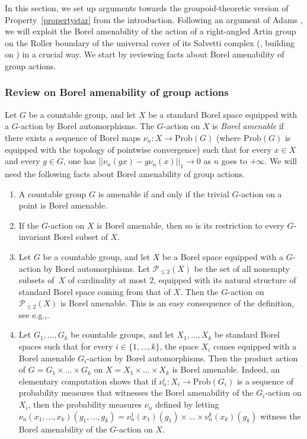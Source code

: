 \documentclass[11pt]{article}
\newcommand{\eg}{e.g.,\xspace}
\numberwithin{equation}{section}
\let\mathcal\mathscr
\theoremstyle{plain}
\theoremstyle{definition}
\newcommand{\calp}{\mathcal{P}}
\newcommand{\Prob}{\mathrm{Prob}}
\begin{document}
In this section, we set up arguments towards the groupoid-theoretic version of Property~\eqref{propertystar} from the introduction. Following an argument of Adams \cite{Ada}, we will exploit the Borel amenability of the action of a right-angled Artin group on the Roller boundary of the universal cover of its Salvetti complex (\cite[Th.\,5.11]{Duc}, building on \cite{BCGNW}) in a crucial way. We start by reviewing facts about Borel amenability of group actions.\enlargethispage{\baselineskip}%

\subsubsection{Review on Borel amenability of group actions}\label{subsubsec:review}

Let $G$ be a countable group, and let $X$ be a standard Borel space equipped with a $G$-action by Borel automorphisms. The $G$-action on $X$ is \emph{Borel amenable} if there exists a sequence of Borel maps $\nu_n:X\to\Prob(G)$ (where $\Prob(G)$ is equipped with the topology of pointwise convergence) such that for every $x\in X$ and every $g\in G$, one has $||\nu_n(gx)-g\nu_n(x)||_1\to 0$ as $n$ goes to $+\infty$. We will need the following facts about Borel amenability of group actions.
\begin{enumerate}
\item A countable group $G$ is amenable if and only if the trivial $G$-action on a point is Borel amenable.
\item If the $G$-action on $X$ is Borel amenable, then so is its restriction to every $G$-invariant Borel subset of $X$.
\item Let $G$ be a countable group, and let $X$ be a Borel space equipped with a $G$\nobreakdash-action by Borel automorphisms. Let $\calp_{\le 2}(X)$ be the set of all nonempty subsets of~$X$ of cardinality at most $2$, equipped with its natural structure of standard Borel space coming from that of $X$. Then the $G$-action on $\calp_{\le 2}(X)$ is Borel amenable. This is an easy consequence of the definition, see \eg \cite[Lem.\,6.14]{HH}.
\item Let $G_1,\dots,G_k$ be countable groups, and let $X_1,\dots,X_k$ be standard Borel spaces such that for every $i\in\{1,\dots,k\}$, the space $X_i$ comes equipped with a Borel amenable $G_i$-action by Borel automorphisms. Then the product action of $G=G_1\times\dots\times G_k$ on $X=X_1\times\dots\times X_k$ is Borel amenable. Indeed, an elementary computation shows that if $\nu_n^i:X_i\to\Prob(G_i)$ is a sequence of probability measures that witnesses the Borel amenability of the $G_i$-action on $X_i$, then the probability measures $\nu_n$ defined by letting $\nu_n(x_1,\dots,x_k)(g_1,\dots,g_k)=\nu_n^1(x_1)(g_1)\times\dots\times\nu_n^k(x_k)(g_k)$ witness the Borel amenability of the $G$-action on $X$.
\end{enumerate}
\end{document}
